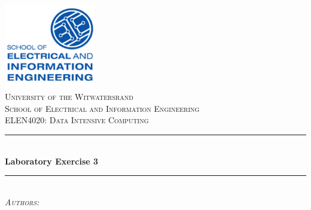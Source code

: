 \documentclass[10pt,twocolumn]{witseiepaper}
\begin{document}
	
	\begin{titlepage}
		
		\newcommand{\HRule}{\rule{\linewidth}{0.3mm}} %
		
		\center %
		
		\includegraphics[width=0.3\textwidth]{EIE.png}\\[1cm] %
		
		\textsc{\LARGE University of the Witwatersrand } \\[0.1cm] %
		\textsc{\LARGE School of Electrical and Information Engineering }\\[1cm] %
		\textsc{\Large ELEN4020: Data Intensive Computing}\\[1.5cm] %
		
		
		\HRule \\[0.4cm]
		{ \huge \bfseries Laboratory Exercise 3} \\[0.4cm] %
		\HRule \\[1.5cm]
		
		\textsc{\Large 	\emph{Authors:} } \\[0.1cm]	 
		

\end{titlepage}
\end{document}
